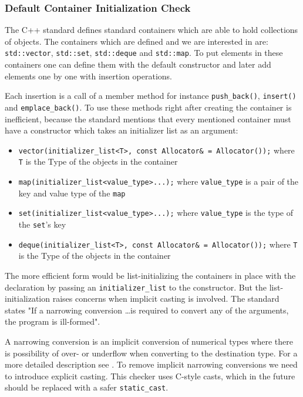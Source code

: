 \subsubsection{Default Container Initialization Check}
\par The C++ standard defines standard containers which are able to hold collections of objects. The containers which are defined and we are interested in are: \verb|std::vector|, \verb|std::set|, \verb|std::deque| and \verb|std::map|. To put elements in these containers one can define them with the default constructor and later add elements one by one with insertion operations. \medskip
\par Each insertion is a call of a member method for instance \verb|push_back()|, \verb|insert()| and \verb|emplace_back()|. To use these methods right after creating the container is inefficient, because the standard mentions that every mentioned container must have a constructor which takes an initializer list as an argument:
\begin{itemize}
	\item \verb|vector(initializer_list<T>, const Allocator& = Allocator());| where \verb|T| is the Type of the objects in the container \cite[\S23.3.6.2]{cpp_standard}
	\item \verb|map(initializer_list<value_type>...);| where \verb|value_type| is a pair of the key and value type of the \verb|map| \cite[\S23.4.4.2]{cpp_standard}
	\item \verb|set(initializer_list<value_type>...);| where \verb|value_type| is the type of the \verb|set|'s key \cite[\S23.4.6.2]{cpp_standard}
	\item \verb|deque(initializer_list<T>, const Allocator& = Allocator());| where \verb|T| is the Type of the objects in the container\cite[\S23.3.3.2]{cpp_standard}
\end{itemize}
\par The more efficient form would be list-initializing the containers in place with the declaration by passing an \verb|initializer_list| to the constructor. But the list-initialization raises concerns when implicit casting is involved. The standard states "If a narrowing conversion \dots is required to convert any of the arguments, the program is ill-formed"\cite[\S8.5.4 3.6]{cpp_standard}. \medskip
\par A narrowing conversion is an implicit conversion of numerical types where there is possibility of over- or underflow when converting to the destination type. For a more detailed description see \cite[\S8.5.4 7]{cpp_standard}. To remove implicit narrowing conversions we need to introduce explicit casting. This checker uses C-style casts, which in the future should be replaced with a safer \verb|static_cast|.
